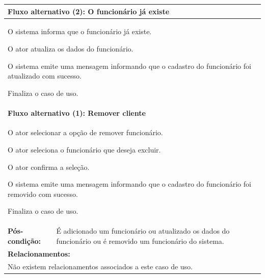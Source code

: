 \documentclass[
	12pt,				%
	openright,
	oneside,			%
	a4paper,			%
	chapter=TITLE,		%
	brazil				%
	]{abntex2}
\begin{document}
\begin{table}[h]
\begin{tabular}{|p{3cm}|p{3cm}|p{3cm}|p{3cm}|}
\multicolumn{4}{|p{12cm}|}{\textbf{Fluxo alternativo (2): O funcionário já existe}}            							\\ \hline
\multicolumn{4}{|p{12cm}|}{%
\begin{alineas}
  \item O sistema informa que o funcionário já existe.
  \item O ator atualiza os dados do funcionário.
  \item O sistema emite uma mensagem informando que o cadastro do funcionário foi atualizado com sucesso.
  \item Finaliza o caso de uso.
\end{alineas}}                                                               				 							\\ \hline

\multicolumn{4}{|p{12cm}|}{\textbf{Fluxo alternativo (1): Remover cliente }}       				     					\\ \hline
\multicolumn{4}{|p{12cm}|}{%
\begin{alineas}
	\item O ator selecionar a opção de remover funcionário.
	\item O ator seleciona o funcionário que deseja excluir.
	\item O ator confirma a seleção. 
  	\item O sistema emite uma mensagem informando que o cadastro do funcionário foi removido com sucesso.
  	\item Finaliza o caso de uso.
  \end{alineas}}                                                               				 							\\ \hline

\textbf{Pós-condição: }  & \multicolumn{3}{p{9cm}|}{ É adicionado um funcionário ou atualizado os dados do funcionário ou é removido %
														um funcionário do sistema. }		\\ \hline
\multicolumn{4}{|p{12cm}|}{\textbf{Relacionamentos:}}                                        								\\ \hline
\multicolumn{4}{|p{12cm}|}{Não existem relacionamentos associados a este caso de uso.}                                  \\ \hline
\end{tabular}
\end{table}
\end{document}

